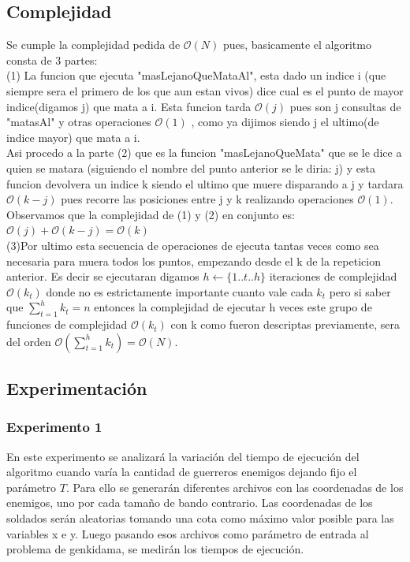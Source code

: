     \subsection{Complejidad}
    Se cumple la complejidad pedida de $\mathcal{O}(N)$ pues,   basicamente el algoritmo consta de 3 partes:\\
    (1) La funcion que ejecuta "masLejanoQueMataAl", esta dado un indice i (que siempre sera el primero de los que aun estan vivos) dice cual es el punto  de mayor indice(digamos j) que mata a i. Esta funcion tarda $\mathcal{O}(j)$ pues son j consultas de "matasAl" y otras operaciones $\mathcal{O}(1)$ , como ya dijimos siendo j el ultimo(de indice mayor) que mata a i.\\
 Asi procedo a la parte (2) que es la funcion "masLejanoQueMata" que se le dice a quien se matara (siguiendo el nombre del punto anterior se le diria: j) y esta funcion devolvera un indice k siendo el ultimo que muere disparando a j y tardara $\mathcal{O}(k-j)$ pues recorre las posiciones entre j y k realizando operaciones $\mathcal{O}(1)$.\\
 Observamos que la complejidad de (1) y (2) en conjunto es: 
 $\mathcal{O}(j) + \mathcal{O}(k-j) =\mathcal{O}(k)  $\\
(3)Por ultimo esta secuencia de operaciones de ejecuta tantas veces como sea necesaria para muera todos los puntos, empezando desde el k de la repeticion anterior. Es decir se ejecutaran digamos $h \gets \{1..t..h\}$ iteraciones de complejidad  $\mathcal{O}(k_t)$ donde no es estrictamente importante cuanto vale cada $k_t$ pero si saber que $\sum_{t=1}^{h} k_t = n$ entonces la complejidad de ejecutar h veces este grupo de funciones de complejidad $ \mathcal{O}(k_t) $ con k como fueron descriptas previamente, sera del orden $ \mathcal{O}(\sum_{t=1}^{h} k_t)=\mathcal{O}(N) $.
    


    \subsection{Experimentación}


    	\subsubsection*{Experimento 1}\;
			En este experimento se analizará la variación del tiempo de ejecución del algoritmo cuando varía la cantidad de guerreros enemigos dejando fijo el parámetro $T$. Para ello se generarán diferentes archivos con las coordenadas de los enemigos, uno por cada tamaño de bando contrario. Las coordenadas de los soldados serán aleatorias tomando una cota como máximo valor posible para las variables x e y. Luego pasando esos archivos como parámetro de entrada al problema de genkidama, se medirán los tiempos de ejecución. \;


